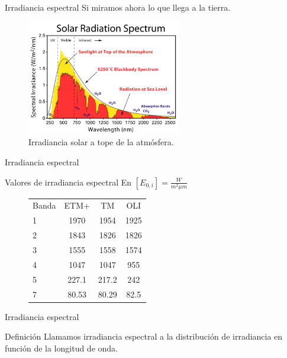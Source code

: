 \documentclass[]{article}
\begin{document}
\begin{frame}{Irradiancia espectral}
  Si miramos ahora lo que llega a la tierra.
  \begin{figure}
    \includegraphics[width=0.6\textwidth]{imagenes/solar_spectrum.png}
    \caption{Irradiancia solar a tope de la atmósfera.}
  \end{figure}
\end{frame}

\begin{frame}{Irradiancia espectral}
  \begin{exampleblock}{Valores de irradiancia espectral}
    En $[E_{0,i}] = \frac{W}{m^2 \mu m}$
    \begin{figure}
      \begin{tabular}{l c c c}
          Banda & ETM+  & TM    &  OLI \\
          1     & 1970  & 1954  & 1925 \\
          2     & 1843  & 1826  & 1826 \\
          3     & 1555  & 1558  & 1574 \\
          4     & 1047  & 1047  & 955  \\
          5     & 227.1 & 217.2 & 242 \\
          7     & 80.53 & 80.29 & 82.5\\
      \end{tabular}
    \end{figure}
  \end{exampleblock}
\end{frame}

\begin{frame}{Irradiancia espectral}
  \begin{block}{Definición}
    Llamamos irradiancia espectral a la distribución de irradiancia en función de la longitud de onda.
  \end{block}
\end{frame}
\end{document}
